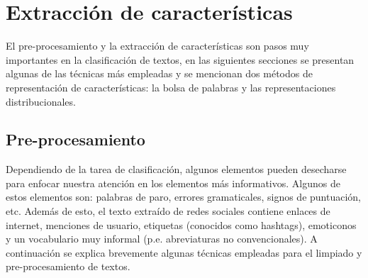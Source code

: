 \section{Extracción de características}
El pre-procesamiento y la extracción de características son pasos muy importantes en la clasificación de textos, en las siguientes secciones se presentan algunas de las técnicas más empleadas y se mencionan dos métodos de representación de características: la bolsa de palabras y las representaciones distribucionales.

\subsection{Pre-procesamiento}
Dependiendo de la tarea de clasificación, algunos elementos pueden desecharse para enfocar nuestra atención en los elementos más informativos. Algunos de estos elementos son: palabras de paro, errores gramaticales, signos de puntuación, etc. Además de esto, el texto extraído de redes sociales contiene enlaces de internet, menciones de usuario, etiquetas (conocidos como hashtags), emoticonos y un vocabulario muy informal (p.e. abreviaturas no convencionales).  A continuación se explica brevemente algunas técnicas empleadas para el limpiado y pre-procesamiento de textos.

